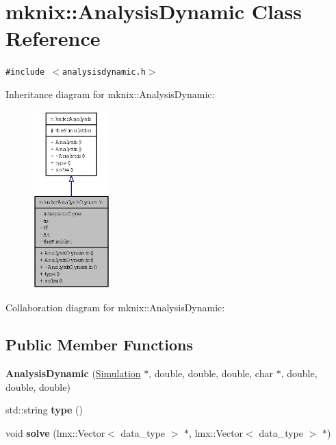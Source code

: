 \hypertarget{classmknix_1_1AnalysisDynamic}{
\section{mknix::AnalysisDynamic Class Reference}
\label{classmknix_1_1AnalysisDynamic}
}
{\tt \#include $<$analysisdynamic.h$>$}

Inheritance diagram for mknix::AnalysisDynamic:\nopagebreak
\begin{figure}[H]
\begin{center}
\leavevmode
\includegraphics[width=85pt]{classmknix_1_1AnalysisDynamic__inherit__graph}
\end{center}
\end{figure}
Collaboration diagram for mknix::AnalysisDynamic:\subsection*{Public Member Functions}
\begin{CompactItemize}
\item 
\hypertarget{classmknix_1_1AnalysisDynamic_452203e81d27283089fe500b32c7ab55}{
\textbf{AnalysisDynamic} (\hyperlink{classmknix_1_1Simulation}{Simulation} $\ast$, double, double, double, char $\ast$, double, double, double)}
\label{classmknix_1_1AnalysisDynamic_452203e81d27283089fe500b32c7ab55}

\item 
\hypertarget{classmknix_1_1AnalysisDynamic_10045ff80be02d24dc08ad7da248844f}{
std::string \textbf{type} ()}
\label{classmknix_1_1AnalysisDynamic_10045ff80be02d24dc08ad7da248844f}

\item 
\hypertarget{classmknix_1_1AnalysisDynamic_43c9ab1907cb3cd72f3f4d605d2fa8ae}{
void \textbf{solve} (lmx::Vector$<$ data\_\-type $>$ $\ast$, lmx::Vector$<$ data\_\-type $>$ $\ast$)}
\label{classmknix_1_1AnalysisDynamic_43c9ab1907cb3cd72f3f4d605d2fa8ae}

\end{CompactItemize}


